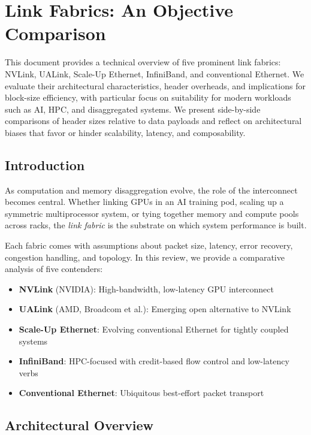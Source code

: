 
\section{Link Fabrics: An Objective Comparison}

This document provides a technical overview of five prominent link fabrics: NVLink, UALink, Scale-Up Ethernet, InfiniBand, and conventional Ethernet. We evaluate their architectural characteristics, header overheads, and implications for block-size efficiency, with particular focus on suitability for modern workloads such as AI, HPC, and disaggregated systems. We present side-by-side comparisons of header sizes relative to data payloads and reflect on architectural biases that favor or hinder scalability, latency, and composability.


\subsection{Introduction}

As computation and memory disaggregation evolve, the role of the interconnect becomes central. Whether linking GPUs in an AI training pod, scaling up a symmetric multiprocessor system, or tying together memory and compute pools across racks, the \textit{link fabric} is the substrate on which system performance is built.

Each fabric comes with assumptions about packet size, latency, error recovery, congestion handling, and topology. In this review, we provide a comparative analysis of five contenders:

\begin{itemize}
  \item \textbf{NVLink} (NVIDIA): High-bandwidth, low-latency GPU interconnect
  \item \textbf{UALink} (AMD, Broadcom et al.): Emerging open alternative to NVLink
  \item \textbf{Scale-Up Ethernet}: Evolving conventional Ethernet for tightly coupled systems
  \item \textbf{InfiniBand}: HPC-focused with credit-based flow control and low-latency verbs
  \item \textbf{Conventional Ethernet}: Ubiquitous best-effort packet transport
\end{itemize}

\subsection{Architectural Overview}

